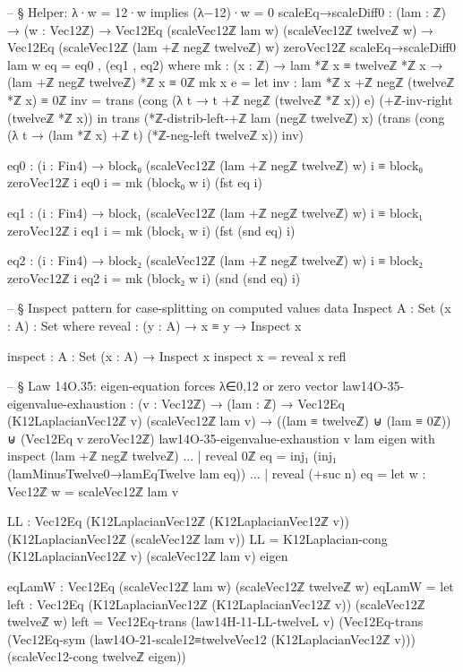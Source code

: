 \documentclass[11pt,a4paper]{book}
\begin{document}
\begin{code}
-- § Helper: λ·w = 12·w implies (λ−12)·w = 0
scaleEq→scaleDiff0 : (lam : ℤ) → (w : Vec12ℤ) →
  Vec12Eq (scaleVec12ℤ lam w) (scaleVec12ℤ twelveℤ w) →
  Vec12Eq (scaleVec12ℤ (lam +ℤ negℤ twelveℤ) w) zeroVec12ℤ
scaleEq→scaleDiff0 lam w eq = eq0 , (eq1 , eq2)
  where
    mk : (x : ℤ) → lam *ℤ x ≡ twelveℤ *ℤ x → (lam +ℤ negℤ twelveℤ) *ℤ x ≡ 0ℤ
    mk x e =
      let
        inv : lam *ℤ x +ℤ negℤ (twelveℤ *ℤ x) ≡ 0ℤ
        inv = trans (cong (λ t → t +ℤ negℤ (twelveℤ *ℤ x)) e) (+ℤ-inv-right (twelveℤ *ℤ x))
      in
      trans
        (*ℤ-distrib-left-+ℤ lam (negℤ twelveℤ) x)
        (trans
          (cong (λ t → (lam *ℤ x) +ℤ t) (*ℤ-neg-left twelveℤ x))
          inv)

    eq0 : (i : Fin4) → block₀ (scaleVec12ℤ (lam +ℤ negℤ twelveℤ) w) i ≡ block₀ zeroVec12ℤ i
    eq0 i = mk (block₀ w i) (fst eq i)

    eq1 : (i : Fin4) → block₁ (scaleVec12ℤ (lam +ℤ negℤ twelveℤ) w) i ≡ block₁ zeroVec12ℤ i
    eq1 i = mk (block₁ w i) (fst (snd eq) i)

    eq2 : (i : Fin4) → block₂ (scaleVec12ℤ (lam +ℤ negℤ twelveℤ) w) i ≡ block₂ zeroVec12ℤ i
    eq2 i = mk (block₂ w i) (snd (snd eq) i)

-- § Inspect pattern for case-splitting on computed values
data Inspect {A : Set} (x : A) : Set where
  reveal : (y : A) → x ≡ y → Inspect x

inspect : {A : Set} (x : A) → Inspect x
inspect x = reveal x refl

-- § Law 14O.35: eigen-equation forces λ∈{0,12} or zero vector
law14O-35-eigenvalue-exhaustion : (v : Vec12ℤ) → (lam : ℤ) →
  Vec12Eq (K12LaplacianVec12ℤ v) (scaleVec12ℤ lam v) →
  ((lam ≡ twelveℤ) ⊎ (lam ≡ 0ℤ)) ⊎ (Vec12Eq v zeroVec12ℤ)
law14O-35-eigenvalue-exhaustion v lam eigen with inspect (lam +ℤ negℤ twelveℤ)
... | reveal 0ℤ eq = inj₁ (inj₁ (lamMinusTwelve0→lamEqTwelve lam eq))
... | reveal (+suc n) eq =
  let
    w : Vec12ℤ
    w = scaleVec12ℤ lam v

    LL : Vec12Eq (K12LaplacianVec12ℤ (K12LaplacianVec12ℤ v)) (K12LaplacianVec12ℤ (scaleVec12ℤ lam v))
    LL = K12Laplacian-cong (K12LaplacianVec12ℤ v) (scaleVec12ℤ lam v) eigen

    eqLamW : Vec12Eq (scaleVec12ℤ lam w) (scaleVec12ℤ twelveℤ w)
    eqLamW =
      let
        left : Vec12Eq (K12LaplacianVec12ℤ (K12LaplacianVec12ℤ v)) (scaleVec12ℤ twelveℤ w)
        left =
          Vec12Eq-trans
            (law14H-11-LL-twelveL v)
            (Vec12Eq-trans
              (Vec12Eq-sym (law14O-21-scale12≡twelveVec12 (K12LaplacianVec12ℤ v)))
              (scaleVec12-cong twelveℤ eigen))


\end{code}
\end{document}
